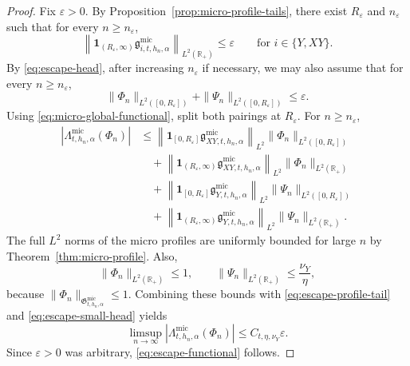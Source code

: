 \documentclass[11pt,a4paper]{amsart}
\theoremstyle{plain}
\theoremstyle{definition}
\theoremstyle{remark}
\newcommand{\R}{\mathbb{R}}
\newcommand{\one}{\mathbf 1}
\begin{document}
\begin{proof}
Fix \(\varepsilon>0\). By Proposition~\ref{prop:micro-profile-tails}, there exist \(R_\varepsilon\)
and \(n_\varepsilon\) such that for every \(n\ge n_\varepsilon\),
\begin{equation}\label{eq:escape-profile-tail}
\left\|
\one_{(R_\varepsilon,\infty)}
\mathfrak g_{i,t,h_n,\alpha}^{\mathrm{mic}}
\right\|_{L^2(\R_+)}
\le
\varepsilon
\qquad\text{for }i\in\{Y,XY\}.
\end{equation}
By \eqref{eq:escape-head}, after increasing \(n_\varepsilon\) if necessary, we may also assume that
for every \(n\ge n_\varepsilon\),
\begin{equation}\label{eq:escape-small-head}
\|\Phi_n\|_{L^2([0,R_\varepsilon])}
+
\|\Psi_n\|_{L^2([0,R_\varepsilon])}
\le
\varepsilon.
\end{equation}
Using \eqref{eq:micro-global-functional}, split both pairings at \(R_\varepsilon\). For \(n\ge
n_\varepsilon\),
\begin{align*}
\left|
\Lambda_{t,h_n,\alpha}^{\mathrm{mic}}(\Phi_n)
\right|
&\le
\left\|
\one_{[0,R_\varepsilon]}
\mathfrak g_{XY,t,h_n,\alpha}^{\mathrm{mic}}
\right\|_{L^2}
\|\Phi_n\|_{L^2([0,R_\varepsilon])}\\
&\quad+
\left\|
\one_{(R_\varepsilon,\infty)}
\mathfrak g_{XY,t,h_n,\alpha}^{\mathrm{mic}}
\right\|_{L^2}
\|\Phi_n\|_{L^2(\R_+)}\\
&\quad+
\left\|
\one_{[0,R_\varepsilon]}
\mathfrak g_{Y,t,h_n,\alpha}^{\mathrm{mic}}
\right\|_{L^2}
\|\Psi_n\|_{L^2([0,R_\varepsilon])}\\
&\quad+
\left\|
\one_{(R_\varepsilon,\infty)}
\mathfrak g_{Y,t,h_n,\alpha}^{\mathrm{mic}}
\right\|_{L^2}
\|\Psi_n\|_{L^2(\R_+)}.
\end{align*}
The full \(L^2\) norms of the micro profiles are uniformly bounded for large \(n\) by
Theorem~\ref{thm:micro-profile}. Also,
\[
\|\Phi_n\|_{L^2(\R_+)}\le1,
\qquad
\|\Psi_n\|_{L^2(\R_+)}\le \frac{\nu_Y}{\eta},
\]
because \(\|\Phi_n\|_{\mathfrak G_{t,h_n,\alpha}^{\mathrm{mic}}}\le1\). Combining these bounds with
\eqref{eq:escape-profile-tail} and \eqref{eq:escape-small-head} yields
\[
\limsup_{n\to\infty}
\left|
\Lambda_{t,h_n,\alpha}^{\mathrm{mic}}(\Phi_n)
\right|
\le
C_{t,\eta,\nu_Y}\varepsilon.
\]
Since \(\varepsilon>0\) was arbitrary, \eqref{eq:escape-functional} follows.
\end{proof}
\end{document}
